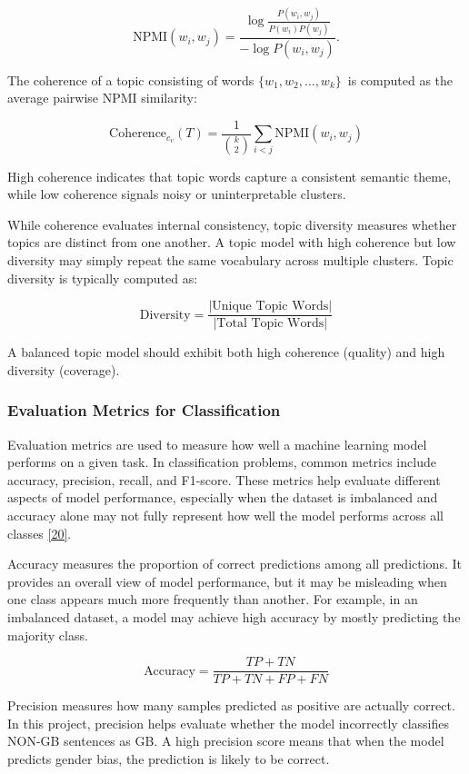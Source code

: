 \documentclass[12pt,oneside,openright,a4paper]{cpe-english-project}
\begin{document}
\[\text{NPMI}(w_i, w_j) = \frac{\log \frac{P(w_i, w_j)}{P(w_i)P(w_j)}}{-\log P(w_i, w_j)}.\]

The coherence of a topic consisting of words $\{w_1, w_2, \dots, w_k\}$~is computed as the average pairwise NPMI similarity:

\[\text{Coherence}_{c_v}(T) = \frac{1}{\binom{k}{2}} \sum_{i < j} \text{NPMI}(w_i, w_j)\]

High coherence indicates that topic words capture a consistent semantic theme, while low coherence signals noisy or uninterpretable clusters.

While coherence evaluates internal consistency, topic diversity measures whether topics are distinct from one another. A topic model with high coherence but low diversity may simply repeat the same vocabulary across multiple clusters. Topic diversity is typically computed as:

\[\text{Diversity} = \frac{|\text{Unique Topic Words}|}{|\text{Total Topic Words}|}\]

A balanced topic model should exhibit both high coherence (quality) and high diversity (coverage).

\subsubsection{Evaluation Metrics for Classification}

Evaluation metrics are used to measure how well a machine learning model performs on a given task. In classification problems, common metrics include accuracy, precision, recall, and F1-score. These metrics help evaluate different aspects of model performance, especially when the dataset is imbalanced and accuracy alone may not fully represent how well the model performs across all classes \hyperlink{bib:ref20}{[20]}.

Accuracy measures the proportion of correct predictions among all predictions. It provides an overall view of model performance, but it may be misleading when one class appears much more frequently than another. For example, in an imbalanced dataset, a model may achieve high accuracy by mostly predicting the majority class.

\[\text{Accuracy} = \frac{TP + TN}{TP + TN + FP + FN}\]

Precision measures how many samples predicted as positive are actually correct. In this project, precision helps evaluate whether the model incorrectly classifies NON-GB sentences as GB. A high precision score means that when the model predicts gender bias, the prediction is likely to be correct.
\end{document}
